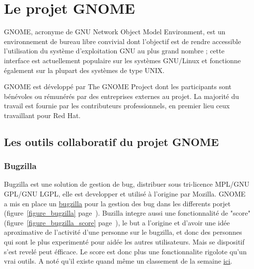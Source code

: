 \documentclass[12pt]{report}
\begin{document}
\chapter{Le projet GNOME}
GNOME, acronyme de GNU Network Object Model Environment, est un
environnement de bureau libre convivial dont l'objectif est de rendre
accessible l'utilisation du système d'exploitation GNU au plus grand
nombre ; cette interface est actuellement populaire sur les systèmes
GNU/Linux et fonctionne également sur la plupart des systèmes de type
UNIX.

GNOME est développé par The GNOME Project dont les participants sont
bénévoles ou rémunérés par des entreprises externes au projet. La
majorité du travail est fournie par les contributeurs professionnels,
en premier lieu ceux travaillant pour Red Hat.

\section{Les outils collaboratif du projet GNOME} 
\subsection{Bugzilla}
\label{bugzilla}
Bugzilla est une solution de gestion de bug, distribuer sous tri-licence 
MPL/GNU GPL/GNU LGPL, elle est developper et utilisé à l'origine par Mozilla.
GNOME a mis en place un \href{https://bugzilla.gnome.org}{bugzilla} pour 
la gestion des bug dans les differents porjet 
(figure~\ref{figure_bugzilla} page~\pageref{figure_bugzilla}).
\newline
Buzilla integre aussi une fonctionnalité de "score" (figure~\ref{figure_bugzilla_score} 
page~\pageref{figure_bugzilla_score}), le but a l'origine et d'avoir une idée 
aproximative de l'activité d'une personne  sur le bugzilla, et donc 
des personnes qui sont le plus experimenté pour aidée les autres 
utilisateurs. Mais se dispositif s'est revelé peut éfficace. Le
score est donc plus une fonctionnalite rigolote qu'un vrai outils.
A noté qu'il existe quand même un classement de la semaine 
\href{https://bugzilla.gnome.org/page.cgi?id=weekly-bug-summary.html}{ici}.
\end{document}
